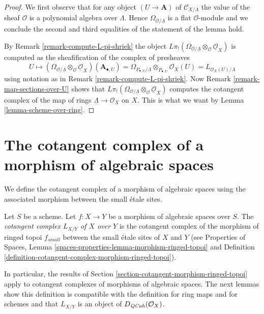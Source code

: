 \begin{proof}
We first observe that for any object $(U \to \mathbf{A})$ of
$\mathcal{C}_{X/\Lambda}$
the value of the sheaf $\mathcal{O}$ is a polynomial algebra over $\Lambda$.
Hence $\Omega_{\mathcal{O}/\underline{\Lambda}}$ is a flat $\mathcal{O}$-module
and we conclude the second and third equalities of the statement of the
lemma hold.

\medskip\noindent
By Remark \ref{remark-compute-L-pi-shriek} the object
$L\pi_!(\Omega_{\mathcal{O}/\underline{\Lambda}}
\otimes_\mathcal{O} \underline{\mathcal{O}}_X)$
is computed as the sheafification of the complex of presheaves
$$
U \mapsto
\left(\Omega_{\mathcal{O}/\underline{\Lambda}}
\otimes_\mathcal{O} \underline{\mathcal{O}}_X\right)(\mathbf{A}_{\bullet, U})
=
\Omega_{P_{\bullet, U}/\Lambda} \otimes_{P_{\bullet, U}} \mathcal{O}_X(U) =
L_{\mathcal{O}_X(U)/\Lambda}
$$
using notation as in Remark \ref{remark-compute-L-pi-shriek}.
Now Remark \ref{remark-map-sections-over-U} shows that
$L\pi_!(\Omega_{\mathcal{O}/\underline{\Lambda}}
\otimes_\mathcal{O} \underline{\mathcal{O}}_X)$
computes the cotangent complex of the map of rings
$\underline{\Lambda} \to \mathcal{O}_X$ on $X$.
This is what we want by Lemma \ref{lemma-scheme-over-ring}.
\end{proof}








\section{The cotangent complex of a morphism of algebraic spaces}
\label{section-cotangent-morphism-spaces}

\noindent
We define the cotangent complex of a morphism of algebraic spaces
using the associated morphism between the small \'etale sites.

\begin{definition}
\label{definition-cotangent-morphism-spaces}
Let $S$ be a scheme. Let $f : X \to Y$ be a morphism of algebraic spaces
over $S$. The {\it cotangent complex $L_{X/Y}$ of $X$ over $Y$} is the
cotangent complex of the morphism of ringed topoi $f_{small}$
between the small \'etale sites of $X$ and $Y$
(see
Properties of Spaces, Lemma
\ref{spaces-properties-lemma-morphism-ringed-topoi}
and
Definition \ref{definition-cotangent-complex-morphism-ringed-topoi}).
\end{definition}

\noindent
In particular, the results of
Section \ref{section-cotangent-morphism-ringed-topoi} apply
to cotangent complexes of morphisms of algebraic spaces.
The next lemmas show this definition is compatible with the definition
for ring maps and for schemes and that $L_{X/Y}$ is an
object of $D_{\mathit{QCoh}}(\mathcal{O}_X)$.

